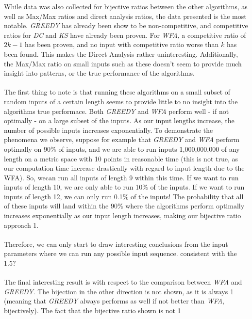 While data was also collected for bijective ratios between the other algorithms, as well as Max/Max ratios and direct analysis ratios, the data presented is the most notable. \textit{GREEDY} has already been show to be non-competitive, and competitive ratios for \textit{DC} and \textit{KS} have already been proven. For \textit{WFA}, a competitive ratio of $2k-1$ has been proven, and no input with competitive ratio worse than $k$ has been found. This makes the Direct Analysis rather uninteresting. Additionally, the Max/Max ratio on small inputs such as these doesn't seem to provide much insight into patterns, or the true performance of the algorithms.
\\ \\
The first thing to note is that running these algorithms on a small subset of random inputs of a certain length seems to provide little to no insight into the algorithms true performace. Both \textit{GREEDY} and \textit{WFA} perform well - if not optimally - on a large subset of the inputs. As our input lengths increase, the number of possible inputs increases exponentially. To demonstrate the phenomena we observe, suppose for example that \textit{GREEDY} and \textit{WFA} perform optimally on 90\% of inputs, and we are able to run inputs 1,000,000,000 of any length on a metric space with 10 points in reasonable time (this is not true, as our computation time increase drastically with regard to input length due to the WFA). So, wecan run all inputs of length 9 within this time. If we want to run inputs of length 10, we are only able to run 10\% of the inputs. If we want to run inputs of length 12, we can only run 0.1\% of the inputs! The probability that all of these inputs will land within the 90\% where the algorithms perform optimally increases exponentially as our input length increases, making our bijective ratio approach 1.
\\ \\
Therefore, we can only start to draw interesting conclusions from the input parameters where we can run any possible input sequence.  consistent with the 1.5?
\\ \\
The final interesting result is with respect to the comparison between \textit{WFA} and \textit{GREEDY}. The bijection in the other direction is not shown, as it is always 1 (meaning that \textit{GREEDY} always performs as well if not better than \textit{WFA}, bijectively). The fact that the bijective ratio shown is not 1 